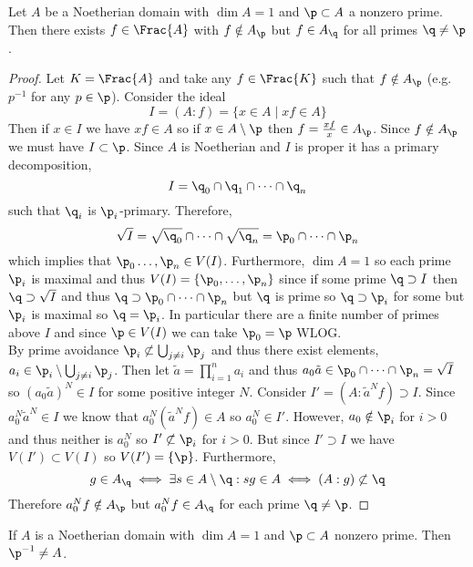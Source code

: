 \documentclass[12pt]{article}
\begin{document}
\begin{lemma}
Let $A$ be a Noetherian domain with $\dim{A} = 1$ and $\p \subset A$ a nonzero prime. Then there exists $f \in \Frac{A}$ with $f \notin A_\p$ but $f \in A_\q$ for all primes $\q \neq \p$.
\end{lemma}

\begin{proof}
Let $K = \Frac{A}$ and take any $f \in \Frac{K}$ such that $f \notin A_\p$ (e.g. $p^{-1}$ for any $p \in \p$). Consider the ideal
\[ I = (A : f) = \{ x \in A \mid x f \in A \} \]
Then if $x \in I$ we have $x f \in A$ so if $x \in A \setminus \p$ then $f = \frac{xf}{x} \in A_\p$. Since $f \notin A_\p$ we must have $I \subset \p$. Since $A$ is Noetherian and $I$ is proper it has a primary decomposition,
\[ I = \q_0 \cap \q_1 \cap \cdots \cap \q_n \]
such that $\q_i$ is $\p_i$-primary. Therefore,
\[ \sqrt{I} = \sqrt{\q_0} \cap \cdots \cap \sqrt{\q_n} = \p_0 \cap \cdots \cap \p_n \]
which implies that $\p_0 \dots, \p_n \in V(I)$. Furthermore, $\dim{A} = 1$ so each prime $\p_i$ is maximal and thus $V(I) = \{\p_0, \dots, \p_n \}$ since if some prime $\q \supset I$ then $\q \supset \sqrt{I}$ and thus $\q \supset \p_0 \cap \cdots \cap \p_n$ but $\q$ is prime so $\q \supset \p_i$ for some but $\p_i$ is maximal so $\q = \p_i$. In particular there are a finite number of primes above $I$ and since $\p \in V(I)$ we can take $\p_0 = \p$ WLOG. 
\bigskip\\
By prime avoidance $\p_i \not\subset \bigcup_{j \neq i} \p_j$ and thus there exist elements, $a_i \in \p_i \setminus \bigcup_{j \neq i} \p_j$. Then let $\tilde{a} = \prod_{i = 1}^n a_i$ and thus $a_0 \tilde{a} \in \p_0 \cap \cdots \cap \p_n = \sqrt{I}$ so $(a_0 \tilde{a})^N \in I$ for some positive integer $N$. Consider $I' = (A : \tilde{a}^N f) \supset I$. Since $a_0^N \tilde{a}^N \in I$ we know that $a_0^N (\tilde{a}^N f) \in A$ so $a_0^N \in I'$. However, $a_0 \notin \p_i$ for $i > 0$ and thus neither is $a_0^N$ so $I' \not\subset \p_i$ for $i > 0$. But since $I' \supset I$ we have $V(I') \subset V(I)$ so $V(I') = \{ \p \}$. Furthermore, 
\[ g \in A_\q \iff \exists s \in A \setminus \q : s g \in A \iff (A : g) \not\subset \q \] 
Therefore $a_0^N f \notin A_\p$ but $a_0^N f \in A_\q$ for each prime $\q \neq \p$.  
\end{proof}

\begin{prop}
If $A$ is a Noetherian domain with $\dim{A} = 1$ and $\p \subset A$ nonzero prime. Then $\p^{-1} \neq A$.
\end{prop}
\end{document}
